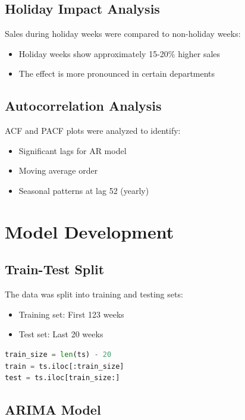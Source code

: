 \documentclass[12pt,a4paper]{report}
\begin{document}
\section{Holiday Impact Analysis}
Sales during holiday weeks were compared to non-holiday weeks:

\begin{itemize}
    \item Holiday weeks show approximately 15-20\% higher sales
    \item The effect is more pronounced in certain departments
\end{itemize}

\section{Autocorrelation Analysis}
ACF and PACF plots were analyzed to identify:
\begin{itemize}
    \item Significant lags for AR model
    \item Moving average order
    \item Seasonal patterns at lag 52 (yearly)
\end{itemize}

\chapter{Model Development}
\label{ch:model_dev}

\section{Train-Test Split}
The data was split into training and testing sets:
\begin{itemize}
    \item Training set: First 123 weeks
    \item Test set: Last 20 weeks
\end{itemize}

\begin{lstlisting}[language=Python]
train_size = len(ts) - 20
train = ts.iloc[:train_size]
test = ts.iloc[train_size:]
\end{lstlisting}

\section{ARIMA Model}
\end{document}
